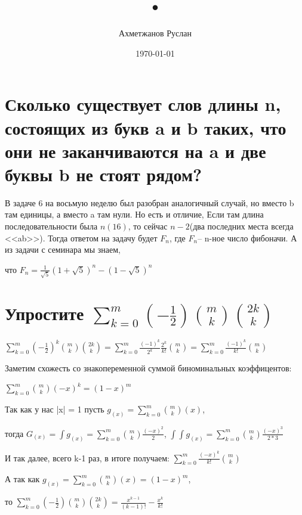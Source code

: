 \documentclass[a4paper,11pt]{article}
\author{Ахметжанов Руслан}
\title{•}
\date{\today}
\begin{document}
\maketitle 

\section{Сколько существует слов длины n, состоящих из букв a и b таких, что они не заканчиваются на a и две буквы b не стоят рядом?}
 В задаче 6 на восьмую неделю был разобран аналогичный случай, но вместо b там единицы, а вместо a там нули. Но есть и отличие, Если там длина последовательности была $n(16)$, то сейчас $n-2$(два последних места всегда <<ab>>). Тогда ответом на задачу будет $F_{n}$, где $F_n$-- n-ное число фибоначи.
 А из задачи с семинара мы знаем,
 
  что $F_n = \frac{1}{\sqrt{5}}(1+\sqrt{5})^n - (1-\sqrt{5})^n $
 
\section{Упростите $\sum_{k=0}^{m}(-\frac{1}{2}) {m \choose k} {2k \choose k}$} 

$\sum\limits_{k=0}^{m}(-\frac{1}{2})^k {m \choose k} {2k \choose k} = \sum\limits_{k=0}^{m} \frac{(-1)^k}{2^k} \frac{2^k}{k!} {m \choose k} = \sum\limits_{k=0}^{m}  \frac{(-1)^k}{k!} {m \choose k}$

Заметим схожесть со знакопеременной суммой биноминальных коэффицентов:

$ \sum\limits_{k=0}^{m} {m \choose k} (-x)^k = (1-x)^m$

Так как у нас |x| = 1 пусть $g_{(x)} = \sum\limits_{k=0}^{m} {m \choose k}(x)$, 

тогда 
$G_{(x)} = \int g_{(x)} =  \sum\limits_{k=0}^{m} {m \choose k} \frac{(-x)^2}{2} $, $ \int \int g_{(x)} =  \sum\limits_{k=0}^{m} {m \choose k} \frac{(-x)^3}{2*3}$


И так далее, всего k-1 раз, в итоге получаем: $\sum\limits_{k=0}^{m}  \frac{(-x)^k}{k!} {m \choose k}$

А так как  $g_{(x)} = \sum\limits_{k=0}^{m} {m \choose k}(x) = (1-x)^m$,

то  $\sum_{k=0}^{m}(-\frac{1}{2}) {m \choose k} {2k \choose k} = \frac{x^{k-1}}{(k-1)!} - \frac{x^k}{k!} $
\end{document}

